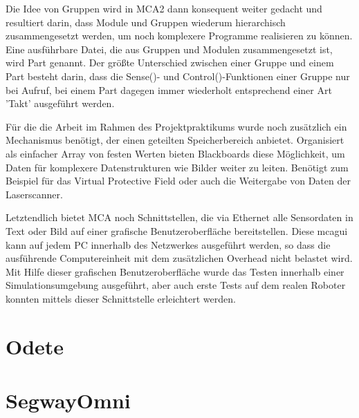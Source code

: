 Die Idee von Gruppen wird in MCA2 dann konsequent weiter gedacht und resultiert darin, dass Module und Gruppen wiederum hierarchisch zusammengesetzt werden, um noch komplexere Programme realisieren zu können. Eine ausführbare Datei, die aus Gruppen und Modulen zusammengesetzt ist, wird Part genannt. Der größte Unterschied zwischen einer Gruppe und einem Part besteht darin, dass die Sense()- und Control()-Funktionen einer Gruppe nur bei Aufruf, bei einem Part dagegen immer wiederholt entsprechend einer Art 'Takt' ausgeführt werden.

Für die die Arbeit im Rahmen des Projektpraktikums wurde noch zusätzlich ein Mechanismus benötigt, der einen geteilten Speicherbereich anbietet. Organisiert als einfacher Array von festen Werten bieten Blackboards diese Möglichkeit, um Daten für komplexere Datenstrukturen wie Bilder weiter zu leiten. Benötigt zum Beispiel für das Virtual Protective Field oder auch die Weitergabe von Daten der Laserscanner. 

Letztendlich bietet MCA noch Schnittstellen, die via Ethernet alle Sensordaten in Text oder Bild auf einer grafische Benutzeroberfläche bereitstellen. Diese mcagui kann auf jedem PC innerhalb des Netzwerkes ausgeführt werden, so dass die ausführende Computereinheit mit dem zusätzlichen Overhead nicht belastet wird. Mit Hilfe dieser grafischen Benutzeroberfläche wurde das Testen innerhalb einer Simulationsumgebung ausgeführt, aber auch erste Tests auf dem realen Roboter konnten mittels dieser Schnittstelle erleichtert werden.



\section{Odete}
\authorsection{\editordirk}


\section{SegwayOmni}
\authorsection{\editordirk}

